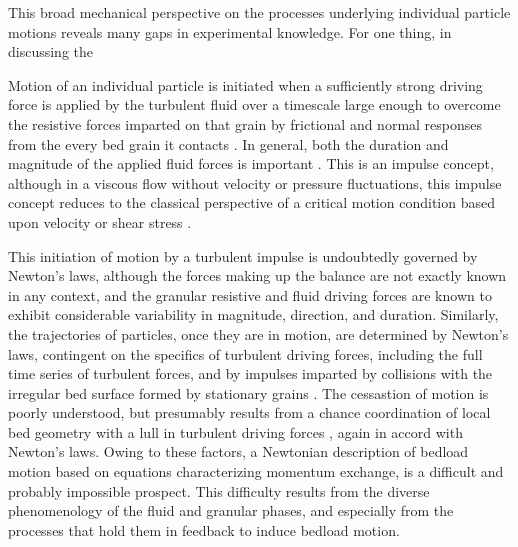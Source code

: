 \documentclass{article}
\begin{document}
This broad mechanical perspective on the processes underlying individual particle motions reveals many gaps in experimental knowledge. 
For one thing, in discussing the 






















Motion of an individual particle is initiated when a sufficiently strong driving force is applied by the turbulent fluid over a timescale large enough to overcome the resistive forces imparted on that grain by frictional and normal responses from the every bed grain it contacts \citep{Paintal1971, Valyrakis2010, Celik2014}. 
In general, both the duration and magnitude of the applied fluid forces is important \citep{Diplas2008, Valkyrus2010, Celik2014}. 
This is an impulse concept, although in a viscous flow without velocity or pressure fluctuations, this impulse concept reduces to the classical perspective of a critical motion condition based upon velocity or shear stress \citep{Shields1936, Buffington1997}. 

This initiation of motion by a turbulent impulse is undoubtedly governed by Newton's laws, although the forces making up the balance are not exactly known in any context, and the granular resistive \citep{Lamb2008} and fluid driving \citep{Schmeeckle2007, Celik2014, Amir2014, Shih2017} forces are known to exhibit considerable variability in magnitude, direction, and duration. 
Similarly, the trajectories of particles, once they are in motion, are determined by Newton's laws, contingent on the specifics of turbulent driving forces, including the full time series of turbulent forces, and by impulses imparted by collisions with the irregular bed surface formed by stationary grains \citep{Wiberg1985, Bialik2015}. 
The cessastion of motion is poorly understood, but presumably results from a chance coordination of local bed geometry with a lull in turbulent driving forces \citep{Pahtz2018}, again in accord with Newton's laws.  
Owing to these factors, a Newtonian description of bedload motion based on equations characterizing momentum exchange, is a difficult and probably impossible prospect. 
This difficulty results from the diverse phenomenology of the fluid and granular phases, and especially from the processes that hold them in feedback to induce bedload motion. 
\end{document}

